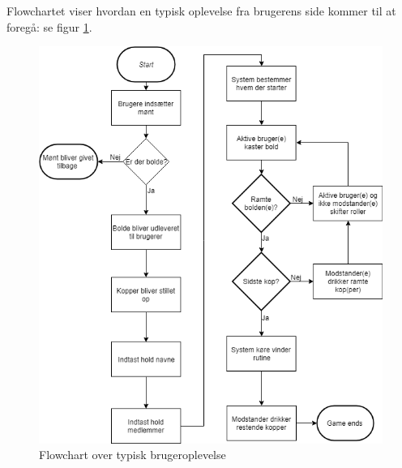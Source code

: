 \documentclass[Kravspecifikation/Kravspec_Main.tex]{subfiles}
\begin{document}
Flowchartet viser hvordan en typisk oplevelse fra brugerens side kommer til at foregå: se figur \ref{fig:flowchart}.

\begin{figure}
    \centering
    \includegraphics[scale=0.5]{Kravspecifikation/Flowchart/pics/Beerpongflowchart.png}
    \caption{Flowchart over typisk brugeroplevelse}
    \label{fig:flowchart}
\end{figure}
\end{document}
